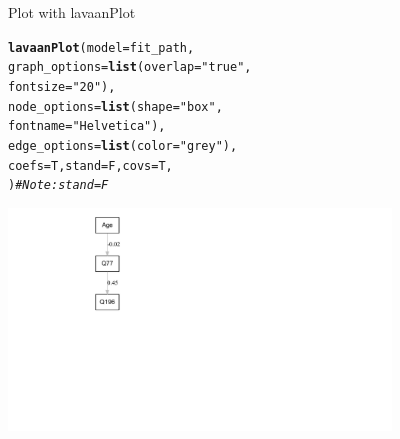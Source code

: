 \documentclass[10pt]{beamer}\usepackage[]{graphicx}\usepackage[]{xcolor}
\makeatletter
\newcommand{\hlstr}[1]{\textcolor[rgb]{0.192,0.494,0.8}{#1}}%
\newcommand{\hlcom}[1]{\textcolor[rgb]{0.678,0.584,0.686}{\textit{#1}}}%
\newcommand{\hlstd}[1]{\textcolor[rgb]{0.345,0.345,0.345}{#1}}%
\newcommand{\hlkwc}[1]{\textcolor[rgb]{0.333,0.667,0.333}{#1}}%
\newcommand{\hlkwd}[1]{\textcolor[rgb]{0.737,0.353,0.396}{\textbf{#1}}}%
\newenvironment{kframe}{%
 \def\at@end@of@kframe{}%
 \ifinner\ifhmode%
  \def\at@end@of@kframe{\end{minipage}}%
  \begin{minipage}{\columnwidth}%
 \fi\fi%
 \def\FrameCommand##1{\hskip\@totalleftmargin \hskip-\fboxsep
 \colorbox{shadecolor}{##1}\hskip-\fboxsep
     \hskip-\linewidth \hskip-\@totalleftmargin \hskip\columnwidth}%
 \MakeFramed {\advance\hsize-\width
   \@totalleftmargin\z@ \linewidth\hsize
   \@setminipage}}%
 {\par\unskip\endMakeFramed%
 \at@end@of@kframe}
\newenvironment{knitrout}{}{} %
\makeatother
\begin{document}
\begin{frame}[fragile]{Plot with lavaanPlot}
\begin{knitrout}
\color{fgcolor}\begin{kframe}
\begin{alltt}
  \hlkwd{lavaanPlot}\hlstd{(}\hlkwc{model} \hlstd{= fit_path,}
           \hlkwc{graph_options} \hlstd{=} \hlkwd{list}\hlstd{(}\hlkwc{overlap} \hlstd{=} \hlstr{"true"}\hlstd{,}
                                \hlkwc{fontsize} \hlstd{=} \hlstr{"20"}\hlstd{),}
           \hlkwc{node_options} \hlstd{=} \hlkwd{list}\hlstd{(}\hlkwc{shape} \hlstd{=} \hlstr{"box"}\hlstd{,}
                               \hlkwc{fontname} \hlstd{=} \hlstr{"Helvetica"}\hlstd{),}
           \hlkwc{edge_options} \hlstd{=} \hlkwd{list}\hlstd{(}\hlkwc{color} \hlstd{=} \hlstr{"grey"}\hlstd{),}
           \hlkwc{coefs} \hlstd{= T,} \hlkwc{stand} \hlstd{= F,} \hlkwc{covs} \hlstd{= T,}
           \hlstd{)} \hlcom{# Note: stand = F}
\end{alltt}
\end{kframe}
\includegraphics[width=4in]{figure/unnamed-chunk-26-1} 
\end{knitrout}
\end{frame}
%
\end{document}
